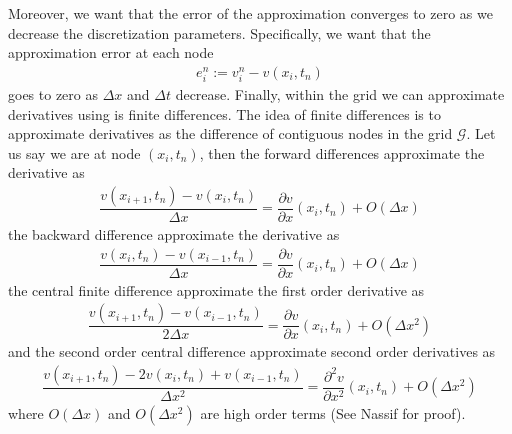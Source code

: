 Moreover, we want that the error of the approximation converges to zero as we decrease the discretization parameters. Specifically, we want that the approximation error at each node 
\begin{align}
  \label{eq:finitedifferencesschemes:overview:local_truncation_error}
  e^{n}_i := v^{n}_i-v(x_i, t_n)
\end{align}
goes to zero as $\Delta{x}$ and $\Delta{t}$ decrease. Finally, within the grid we can approximate derivatives using is finite differences\cite{nassif2016introduction}. The idea of finite differences is to approximate derivatives as the difference of contiguous nodes in the grid $\mathcal{G}$. Let us say we are at node $(x_i, t_n)$, then the forward differences approximate the derivative as
\begin{align}
  \label{eq:finitedifferencesschemes:overview:forward_difference}
 \dfrac{v(x_{i+1},t_n) - v(x_{i}, t_n)}{\Delta{x}} = \dfrac{\partial{v}}{\partial{x}}(x_i, t_n) + O(\Delta{x})
\end{align}
the backward difference approximate the derivative as 
\begin{align}
  \label{eq:finitedifferencesschemes:overview:backward_difference}
  \dfrac{v(x_{i},t_n) - v(x_{i-1}, t_n)}{\Delta{x}} = \dfrac{\partial{v}}{\partial{x}}(x_i, t_n) + O(\Delta{x})
\end{align}
the central finite difference approximate the first order derivative as 
\begin{align}
  \label{eq:finitedifferencesschemes:overview:first_order_central_difference}
  \dfrac{v(x_{i+1},t_n) - v(x_{i-1}, t_n)}{2\Delta{x}} = \dfrac{\partial{v}}{\partial{x}}(x_i, t_n) + O(\Delta{x}^2)
 \end{align}
and the second order central difference approximate second order derivatives as
\begin{align}
  \label{eq:finitedifferencesschemes:overview:second_order_central_difference}
  \dfrac{v(x_{i+1},t_n) - 2v(x_i,t_n) + v(x_{i-1}, t_n)}{\Delta{x}^2} = \dfrac{\partial^2{v}}{\partial{x^2}}(x_i, t_n) + O(\Delta{x}^2)
 \end{align}
where $O(\Delta{x})$ and $O(\Delta{x}^2)$ are high order terms (See Nassif\cite{nassif2016introduction} for proof). 

